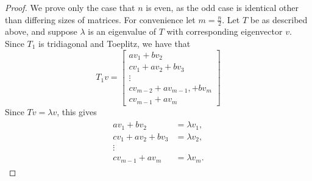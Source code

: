 \documentclass[10pt,twocolumn]{article}
\begin{document}
\begin{proof}
    We prove only the case that $n$ is even, as the odd case is identical other than differing sizes of matrices. For convenience let $m=\frac{n}{2}$. Let $T$ be as described above, and suppose $\lambda$ is an eigenvalue of $T$ with corresponding eigenvector $v$. Since $T_1$ is tridiagonal and Toeplitz, we have that
    $$T_1v=\begin{bmatrix}
        av_1 + bv_2\\
        cv_1 + av_2 + bv_3 \\
        \vdots\\
        cv_{m-2} + av_{m-1}, + bv_{m}\\
        cv_{m-1} + av_m
    \end{bmatrix}$$
    Since $Tv=\lambda v$, this gives 
    \begin{align}\tag{$\star$}
        \begin{split}\label{lambdas}
        av_1+bv_2 &= \lambda v_1,\\
        cv_1+av_2+bv_3 &= \lambda v_2,\\
        \vdots\\
        cv_{m-1}+av_m&=\lambda v_m.
        \end{split}
    \end{align}


\end{proof}
\end{document}

